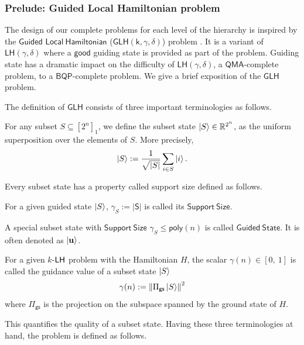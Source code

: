 \documentclass[11pt]{article}
\newcommand{\ms}[1]{\mathsf{#1}}
\begin{document}
\subsubsection{Prelude: Guided Local Hamiltonian problem}
The design of our complete problems for each level of the hierarchy is inspired by the $\mathsf{Guided}$ $\mathsf{Local\ Hamiltonian}$ ($\ms{GLH}$$\mathsf{(k,\gamma,\delta)}$) problem \cite{gharibian2022dequantizing, cade2022complexity}. It is a variant of $\ms{LH}(\gamma,\delta)$ where a $\mathsf{good}$ guiding state is provided as part of the problem. Guiding state has a dramatic impact on the difficulty of $\ms{LH}(\gamma,\delta)$, a $\ms{QMA}$-complete problem, to a $\ms{BQP}$-complete problem. We give a brief exposition of the $\ms{GLH}$ problem.\par
The definition of $\ms{GLH}$ consists of three important terminologies as follows.
\begin{definition}
     For any subset $S\subseteq [2^n]_1$, we define the subset state $\ket{S}\in \mathbb{R}^{2^n}$, as the uniform superposition over the elements of $S$. More precisely,
\begin{equation}
    \ket{S}:= \frac{1}{\sqrt{|S|}}\sum_{i\in S}\ket{i}.
\end{equation}
\end{definition}
Every subset state has a property called support size defined as follows.
\begin{definition}
    [$\ms{Support\ Size}$ of a subset state] For a given guided state $\ket{S}$, $\gamma_S:=\ms{|S|}$ is called its $\ms{Support\ Size}$.
\end{definition}
A special subset state with $\ms{Support\ Size}$ $\gamma_S \leq \ms{poly}(n)$ is called $\mathsf{Guided\ State}$. It is often denoted as $\ket{\uu}$. 
\begin{definition}
     For a given $k$-$\LH$ problem with the Hamiltonian $H$, the scalar $\gamma(n)\in [0,\ 1]$ is called the guidance value of a subset state $\ket{S}$ $$\gamma(n):=\norm{\Pi_{\mathsf{gs}}\ket{S}}^2$$ where $\Pi_{\mathsf{gs}}$ is the projection on the subspace spanned by the ground state of $H$.
\end{definition}
This quantifies the quality of a subset state. Having these three terminologies at hand, the problem is defined as follows.
$$
\end{document}
